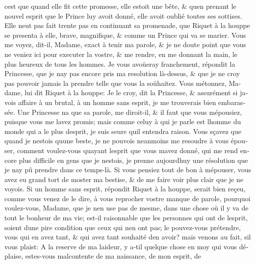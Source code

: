 \documentclass[14pt,a4paper]{memoir}
\begin{document}
{{\begin{otherlanguage}{french}
c\textquotesingle est que quand elle fit cette promesse, elle estoit une
bête, \& qu\textquotesingle en prenant le nouvel esprit que le Prince
luy avoit donné, elle avoit oublié toutes ses sottises. Elle
n\textquotesingle eut pas fait trente pas en continuant sa promenade,
que Riquet à la houppe se presenta à elle, brave, magnifique, \& comme
un Prince qui va se marier. Vous me voyez, dit-il, Madame, exact à tenir
ma parole, \& je ne doute point que vous ne veniez ici pour executer la
vostre, \& me rendre, en me donnant la main, le plus heureux de tous les
hommes. Je vous avoüeray franchement, répondit la Princesse, que je
n\textquotesingle ay pas encore pris ma resolution là-dessus, \& que je
ne croy pas pouvoir jamais la prendre telle que vous la soühaitez. Vous
m\textquotesingle étonnez, Madame, lui dit Riquet à la houppe: Je le
croy, dit la Princesse, \& assurément si j\textquotesingle avois affaire
à un brutal, à un homme sans esprit, je me trouverais bien embarassée.
Une Princesse n\textquotesingle a que sa parole, me diroit-il, \& il
faut que vous m\textquotesingle épousiez, puisque vous me
l\textquotesingle avez promis; mais comme celuy à qui je parle est
l\textquotesingle homme du monde qui a le plus d\textquotesingle esprit,
je suis seure qu\textquotesingle il entendra raison. Vous sçavez que
quand je n\textquotesingle estois qu\textquotesingle une beste, je ne
pouvois neanmoins me resoudre à vous épouser, comment voulez-vous
qu\textquotesingle ayant l\textquotesingle esprit que vous
m\textquotesingle avez donné, qui me rend encore plus difficile en gens
que je n\textquotesingle estois, je prenne aujourd\textquotesingle huy
une résolution que je n\textquotesingle ay pû prendre dans ce temps-là.
Si vous pensiez tout de bon à m\textquotesingle épouser, vous avez eu
grand tort de m\textquotesingle oster ma bestise, \& de me faire voir
plus clair que je ne voyois. Si un homme sans esprit, répondit Riquet à
la houppe, serait bien reçeu, comme vous venez de le dire, à vous
reprocher vostre manque de parole, pourquoi voulez-vous, Madame, que je
n\textquotesingle en use pas de mesme, dans une chose où il y va de tout
le bonheur de ma vie; est-il raisonnable que les personnes qui ont de
l\textquotesingle esprit, soient d\textquotesingle une pire condition
que ceux qui n\textquotesingle en ont pas; le pouvez-vous prétendre,
vous qui en avez tant, \& qui avez tant souhaité d\textquotesingle en
avoir? mais venons au fait, s\textquotesingle il vous plaist: A la
reserve de ma laideur, y a-t\textquotesingle il quelque chose en moy qui
vous déplaise, estes-vous malcontente de ma naissance, de mon esprit, de

\end{otherlanguage}}}
\end{document}
